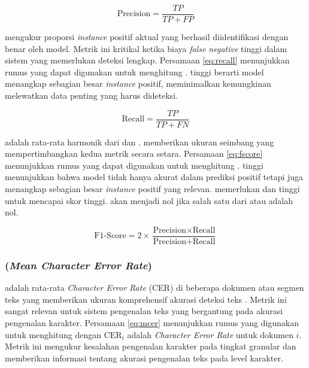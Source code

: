 \begin{equation}
    \label{eq:precision}
\text{Precision} = \frac{TP}{TP + FP}
\end{equation}

\recallfl{} mengukur proporsi \emph{instance} positif aktual yang berhasil diidentifikasi dengan benar oleh model. Metrik ini kritikal ketika biaya \emph{false negative} tinggi dalam sistem yang memerlukan deteksi lengkap. Persamaan \eqref{eq:recall} menunjukkan rumus yang dapat digunakan untuk menghitung \recall{} \parencite{jayaswal2020evalmetrics}.\recallfl{} tinggi berarti model menangkap sebagian besar \emph{instance} positif, meminimalkan kemungkinan melewatkan data penting yang harus dideteksi.

\begin{equation}
    \label{eq:recall}
\text{Recall} = \frac{TP}{TP + FN}
\end{equation}

\fscore{} adalah rata-rata harmonik dari \precision{} dan \recall{}. \fscore{} memberikan ukuran seimbang yang mempertimbangkan kedua metrik secara setara. Persamaan \eqref{eq:fscore} menunjukkan rumus yang dapat digunakan untuk menghitung \fscore{} \parencite{jayaswal2020evalmetrics}. \fscore{} tinggi menunjukkan bahwa model tidak hanya akurat dalam prediksi positif tetapi juga menangkap sebagian besar \emph{instance} positif yang relevan. \fscore{} memerlukan \precision{} dan \recall{} tinggi untuk mencapai skor tinggi. \fscore{} akan menjadi nol jika salah satu dari \precision{} atau \recall{} adalah nol.

\begin{equation}
    \label{eq:fscore}
\text{F1-Score} = 2 \times \frac{\text{Precision} \times \text{Recall}}{\text{Precision} + \text{Recall}}
\end{equation}

% 

\subsubsection{\mcer{} (\emph{Mean Character Error Rate})}

\mcer{} adalah rata-rata \emph{Character Error Rate} (CER) di beberapa dokumen atau segmen teks yang memberikan ukuran komprehensif akurasi deteksi teks \parencite{neudecker2021survey}. Metrik ini sangat relevan untuk sistem pengenalan teks yang bergantung pada akurasi pengenalan karakter. Persamaan \eqref{eq:mcer} menunjukkan rumus yang digunakan untuk menghitung \mcer{} dengan $\text{CER}_i$ adalah \emph{Character Error Rate} untuk dokumen $i$. Metrik ini mengukur kesalahan pengenalan karakter pada tingkat granular dan memberikan informasi tentang akurasi pengenalan teks pada level karakter.

